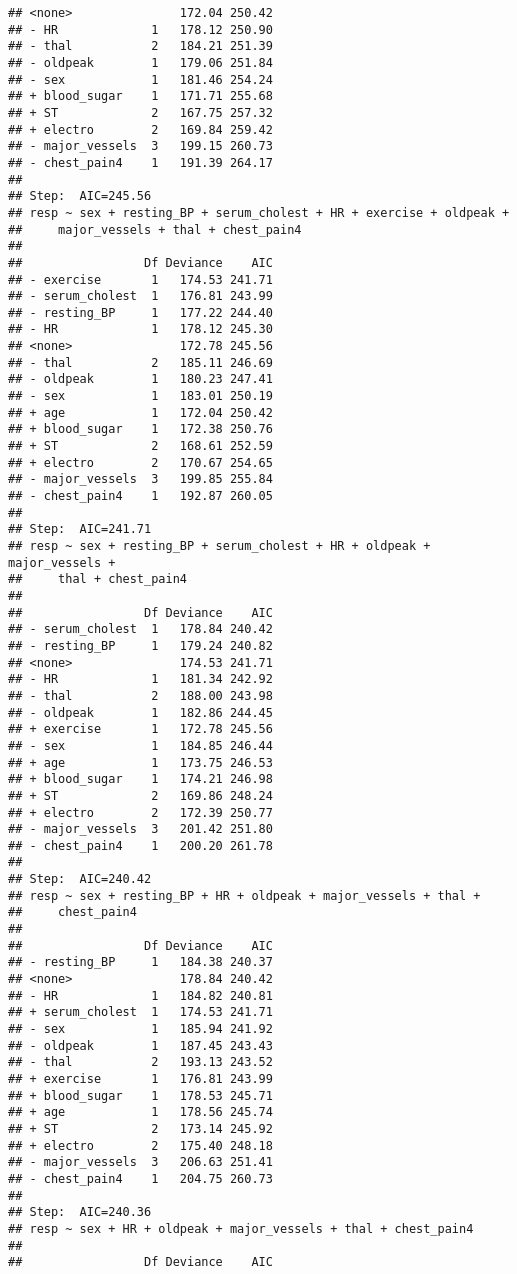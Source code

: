 \documentclass[]{article}
\begin{document}
\begin{verbatim}
## <none>               172.04 250.42
## - HR             1   178.12 250.90
## - thal           2   184.21 251.39
## - oldpeak        1   179.06 251.84
## - sex            1   181.46 254.24
## + blood_sugar    1   171.71 255.68
## + ST             2   167.75 257.32
## + electro        2   169.84 259.42
## - major_vessels  3   199.15 260.73
## - chest_pain4    1   191.39 264.17
## 
## Step:  AIC=245.56
## resp ~ sex + resting_BP + serum_cholest + HR + exercise + oldpeak + 
##     major_vessels + thal + chest_pain4
## 
##                 Df Deviance    AIC
## - exercise       1   174.53 241.71
## - serum_cholest  1   176.81 243.99
## - resting_BP     1   177.22 244.40
## - HR             1   178.12 245.30
## <none>               172.78 245.56
## - thal           2   185.11 246.69
## - oldpeak        1   180.23 247.41
## - sex            1   183.01 250.19
## + age            1   172.04 250.42
## + blood_sugar    1   172.38 250.76
## + ST             2   168.61 252.59
## + electro        2   170.67 254.65
## - major_vessels  3   199.85 255.84
## - chest_pain4    1   192.87 260.05
## 
## Step:  AIC=241.71
## resp ~ sex + resting_BP + serum_cholest + HR + oldpeak + major_vessels + 
##     thal + chest_pain4
## 
##                 Df Deviance    AIC
## - serum_cholest  1   178.84 240.42
## - resting_BP     1   179.24 240.82
## <none>               174.53 241.71
## - HR             1   181.34 242.92
## - thal           2   188.00 243.98
## - oldpeak        1   182.86 244.45
## + exercise       1   172.78 245.56
## - sex            1   184.85 246.44
## + age            1   173.75 246.53
## + blood_sugar    1   174.21 246.98
## + ST             2   169.86 248.24
## + electro        2   172.39 250.77
## - major_vessels  3   201.42 251.80
## - chest_pain4    1   200.20 261.78
## 
## Step:  AIC=240.42
## resp ~ sex + resting_BP + HR + oldpeak + major_vessels + thal + 
##     chest_pain4
## 
##                 Df Deviance    AIC
## - resting_BP     1   184.38 240.37
## <none>               178.84 240.42
## - HR             1   184.82 240.81
## + serum_cholest  1   174.53 241.71
## - sex            1   185.94 241.92
## - oldpeak        1   187.45 243.43
## - thal           2   193.13 243.52
## + exercise       1   176.81 243.99
## + blood_sugar    1   178.53 245.71
## + age            1   178.56 245.74
## + ST             2   173.14 245.92
## + electro        2   175.40 248.18
## - major_vessels  3   206.63 251.41
## - chest_pain4    1   204.75 260.73
## 
## Step:  AIC=240.36
## resp ~ sex + HR + oldpeak + major_vessels + thal + chest_pain4
## 
##                 Df Deviance    AIC

\end{verbatim}
\end{document}
